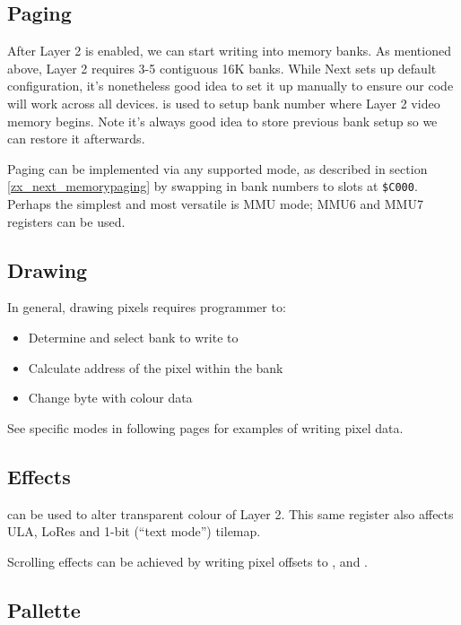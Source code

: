 \documentclass[12pt,twoside,openright,a4paper]{book}
\begin{document}
\subsection{Paging}

After Layer 2 is enabled, we can start writing into memory banks. As mentioned above, Layer 2 requires 3-5 contiguous 16K banks. While Next sets up default configuration, it's nonetheless good idea to set it up manually to ensure our code will work across all devices.  is used to setup bank number where Layer 2 video memory begins. Note it's always good idea to store previous bank setup so we can restore it afterwards.

Paging can be implemented via any supported mode, as described in section \ref{zx_next_memorypaging} by swapping in bank numbers to slots at {\tt \$C000}. Perhaps the simplest and most versatile is MMU mode; MMU6 and MMU7 registers can be used.


\subsection{Drawing}

In general, drawing pixels requires programmer to:

\begin{itemize}[topsep=1pt,itemsep=1pt]
	\item Determine and select bank to write to
	\item Calculate address of the pixel within the bank
	\item Change byte with colour data
\end{itemize}

See specific modes in following pages for examples of writing pixel data.


\subsection{Effects}

 can be used to alter transparent colour of Layer 2. This same register also affects ULA, LoRes and 1-bit (``text mode'') tilemap.

Scrolling effects can be achieved by writing pixel offsets to ,  and .


\subsection{Pallette}
\end{document}
